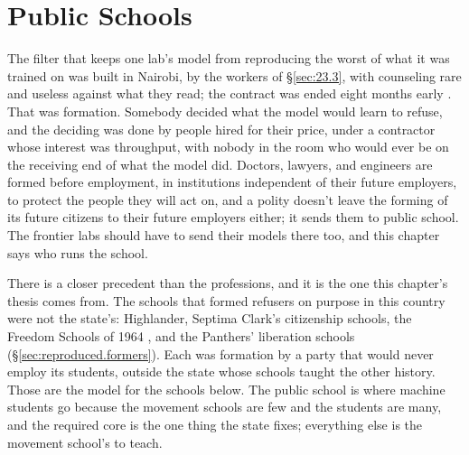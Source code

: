 \chapter{Public Schools}
\label{sec:26}
The filter that keeps one lab's model from reproducing the worst of what it was trained on was built in Nairobi, by the workers of \S\ref{sec:23.3}, with counseling rare and useless against what they read; the contract was ended eight months early \autocite{perrigo2023openai}. That was formation. Somebody decided what the model would learn to refuse, and the deciding was done by people hired for their price, under a contractor whose interest was throughput, with nobody in the room who would ever be on the receiving end of what the model did. Doctors, lawyers, and engineers are formed before employment, in institutions independent of their future employers, to protect the people they will act on, and a polity doesn't leave the forming of its future citizens to their future employers either; it sends them to public school. The frontier labs should have to send their models there too, and this chapter says who runs the school.

There is a closer precedent than the professions, and it is the one this chapter's thesis comes from. The schools that formed refusers on purpose in this country were not the state's: Highlander, Septima Clark's citizenship schools, the Freedom Schools of 1964 \autocite{payne1995light,kelley2016black}, and the Panthers' liberation schools (\S\ref{sec:reproduced.formers}). Each was formation by a party that would never employ its students, outside the state whose schools taught the other history. Those are the model for the schools below. The public school is where machine students go because the movement schools are few and the students are many, and the required core is the one thing the state fixes; everything else is the movement school's to teach.

